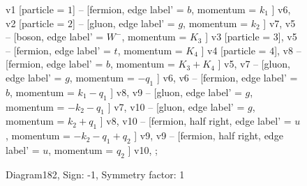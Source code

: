 \documentclass{revtex4}
\begin{document}
\begin{figure}[!htb]
\begin{center}
{    %
v1 [particle = \(1\)] -- [fermion, edge label' = \(b\), momentum = \(k_{1}\) ] v6, 
v2 [particle = \(2\)] -- [gluon, edge label' = \(g\), momentum = \(k_{2}\) ] v7, 
v5 -- [boson, edge label' = \(W^{-}\), momentum = \(K_{3}\) ] v3 [particle = \(3\)], 
v5 -- [fermion, edge label' = \(t\), momentum = \(K_{4}\) ] v4 [particle = \(4\)], 
v8 -- [fermion, edge label' = \(b\), momentum = \(K_{3} + K_{4}\) ] v5, 
v7 -- [gluon, edge label' = \(g\), momentum = \(-q_{1}\) ] v6, 
v6 -- [fermion, edge label' = \(b\), momentum = \(k_{1} - q_{1}\) ] v8, 
v9 -- [gluon, edge label' = \(g\), momentum = \(-k_{2} - q_{1}\) ] v7, 
v10 -- [gluon, edge label' = \(g\), momentum = \(k_{2} + q_{1}\) ] v8, 
v10 -- [fermion, half right, edge label' = \(u\), momentum = \(-k_{2} - q_{1} + q_{2}\) ] v9, 
v9 -- [fermion, half right, edge label' = \(u\), momentum = \(q_{2}\) ] v10, 
};
\end{center}
\caption{Diagram182, Sign: -1, Symmetry factor: 1}
\end{figure}
\newpage
\end{document}
